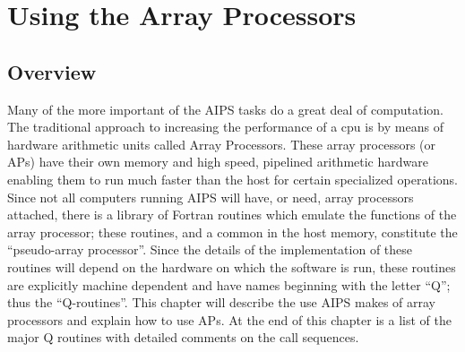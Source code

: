 \setcounter{chapter}{11} %
\chapter{Using the Array Processors}
\setcounter{page}{1}
\section{Overview }
Many of the more important of the AIPS tasks do a great deal of
computation. The traditional approach to increasing the
performance of a cpu is by means of hardware arithmetic units called
Array Processors.  These array processors (or APs) have their own
memory and high speed, pipelined arithmetic hardware enabling them to
run much faster than the host for certain specialized operations.
Since not all computers running AIPS will have, or need, array
processors attached, there is a library of Fortran routines which
emulate the functions of the array processor; these routines, and a
common in the host memory, constitute the ``pseudo-array processor''.
Since the details of the implementation of these routines will depend
on the hardware on which the software is run, these routines are
explicitly machine dependent and have names beginning with the letter
``Q''; thus the ``Q-routines''. This chapter will describe the use AIPS
makes of array processors and explain how to use APs. At the end of
this chapter is a list of the major Q routines with detailed comments
on the call sequences.

